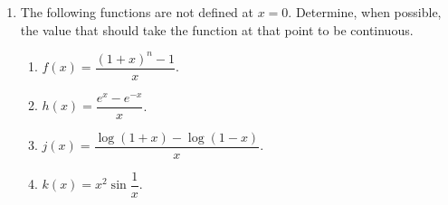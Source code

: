 \begin{enumerate}[leftmargin=*]
\item The following functions are not defined at $x=0$.
Determine, when possible, the value that should take the function at that point to be continuous. 
\begin{multicols}{2}
\begin{enumerate}
\item $f(x)=\dfrac{(1+x)^n-1}{x}$.
\item $h(x)=\dfrac{e^x-e^{-x}}{x}$.
\item $j(x)=\dfrac{\log(1+x)-\log(1-x)}{x}$.
\item $k(x)=x^2\sin\dfrac{1}{x}$.
\end{enumerate}
\end{multicols}

\end{enumerate}
